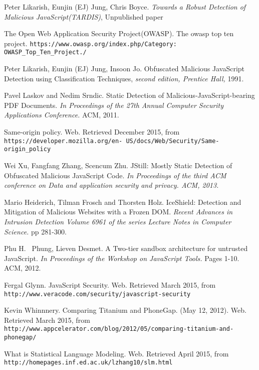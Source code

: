 \begin{thebibliography}{10}

 Peter Likarish, Eunjin (EJ) Jung, Chris Boyce. {\it Towards a Robust Detection of Malicious JavaScript(TARDIS)}, Unpublished paper

 The Open Web Application Security Project(OWASP). The owasp top ten project.
{\small\verb+https://www.owasp.org/index.php/Category: OWASP_Top_Ten_Project./+}

 Peter Likarish, Eunjin (EJ) Jung, Insoon Jo. Obfuscated Malicious JavaScript Detection using Classification Techniques, {\it  second edition, Prentice Hall,}  1991.

 Pavel Laskov and Nedim Srndic. Static Detection of Malicious-JavaScript-bearing PDF Documents. {\it In Proceedings of the 27th Annual Computer Security Applications Conference. }ACM, 2011.

 Same-origin policy. Web. Retrieved December 2015, from\\
{\small\verb+https://developer.mozilla.org/en- US/docs/Web/Security/Same-origin_policy+}

 Wei Xu, Fangfang Zhang, Scencum Zhu. JStill: Mostly Static Detection of Obfuscated
Malicious JavaScript Code. {\it In Proceedings of the third ACM conference on Data and
application security and privacy. ACM, 2013.}

 Mario Heiderich, Tilman Frosch and Thorsten Holz. IceShield: Detection and Mitigation of Malicious Websites with a Frozen DOM. {\it Recent Advances in Intrusion Detection Volume 6961 of the series Lecture Notes in Computer Science.} pp 281-300.

 Phu H.~ Phung, Lieven Desmet. A Two-tier sandbox architecture for untrusted JavaScript. {\it In Proceedings of the Workshop on JavaScript Tools.} Pages 1-10. ACM, 2012.

 Fergal Glynn. JavaScript Security. Web. Retrieved March 2015, from\\
{\small\verb+http://www.veracode.com/security/javascript-security+}

 Kevin Whinnnery. Comparing Titanium and PhoneGap. (May 12, 2012). Web. Retrieved March 2015, from\\
 {\small\verb+http://www.appcelerator.com/blog/2012/05/comparing-titanium-and-phonegap/+}

 What is Statistical Language Modeling. Web. Retrieved April 2015, from\\
 {\small\verb+http://homepages.inf.ed.ac.uk/lzhang10/slm.html+}


\end{thebibliography}
